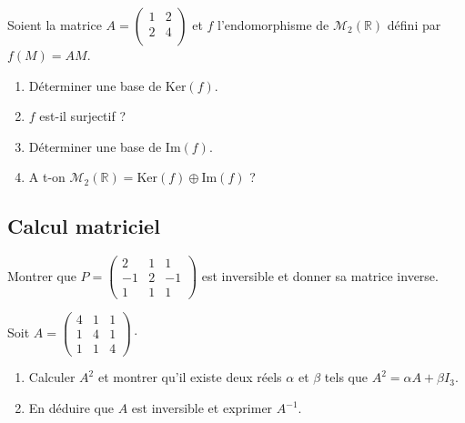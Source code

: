 \documentclass[a4paper,twoside,french,11pt]{VcCours}
\begin{document}

\begin{Exercice}{}
  Soient la matrice $A= \begin{pmatrix}
    1 & 2 \\
    2 & 4 \\
  \end{pmatrix}$ et $f$ l'endomorphisme de $\mathcal{M}_2(\mathbb{R})$ défini par $f(M)=AM$.
  
  \begin{enumerate}
    \item Déterminer une base de $\textrm{Ker}(f)$.
    \item $f$ est-il surjectif ?
    \item Déterminer une base de $\textrm{Im}(f)$.
    \item A t-on $\mathcal{M}_2(\mathbb{R}) = \textrm{Ker}(f) \oplus \textrm{Im}(f)$ ?
  \end{enumerate}
\end{Exercice} 
  
\subsection{Calcul matriciel}

\begin{Exercice}{}
  Montrer que $P = \begin{pmatrix}
    2 & 1 & 1 \\
    -1 & 2 & -1 \\
    1 & 1 & 1
  \end{pmatrix}$ est inversible et donner sa matrice inverse.
\end{Exercice} 
  
\begin{Exercice}{}
  
  Soit $A = \begin{pmatrix} 4&1&1\\1&4&1\\1&1&4\end{pmatrix} \cdot$
  \begin{enumerate}
    \item Calculer $A^2$ et montrer qu'il existe deux réels $\alpha$ et $\beta$ tels que $A^2 = \alpha A + \beta I_3$.
    \item En déduire que $A$ est inversible et exprimer $A^{-1}$.
  \end{enumerate}
\end{Exercice} 
  
\end{document}
